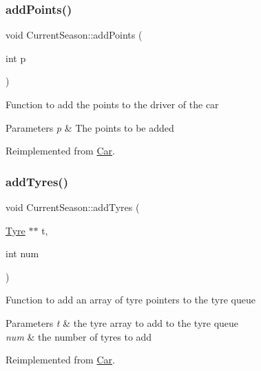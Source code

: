 \subsubsection{\texorpdfstring{add\+Points()}{addPoints()}}
{\footnotesize\ttfamily void Current\+Season\+::add\+Points (\begin{DoxyParamCaption}\item[{int}]{p }\end{DoxyParamCaption})\hspace{0.3cm}{\ttfamily [virtual]}}

Function to add the points to the driver of the car 
\begin{DoxyParams}{Parameters}
{\em p} & The points to be added \\
\hline
\end{DoxyParams}


Reimplemented from \hyperlink{classCar_a946872fcdb7625c343e5caf90fa39617}{Car}.

\mbox{\label{classCurrentSeason_a62e6e6c10c5490084230d4c3722196e5}} 
\subsubsection{\texorpdfstring{add\+Tyres()}{addTyres()}}
{\footnotesize\ttfamily void Current\+Season\+::add\+Tyres (\begin{DoxyParamCaption}\item[{\hyperlink{classTyre}{Tyre} $\ast$$\ast$}]{t,  }\item[{int}]{num }\end{DoxyParamCaption})\hspace{0.3cm}{\ttfamily [virtual]}}

Function to add an array of tyre pointers to the tyre queue 
\begin{DoxyParams}{Parameters}
{\em t} & the tyre array to add to the tyre queue \\
\hline
{\em num} & the number of tyres to add \\
\hline
\end{DoxyParams}


Reimplemented from \hyperlink{classCar_a5c5f22cb9232b88a53a4ffc324824aa1}{Car}.

\mbox{\label{classCurrentSeason_af605da3db8d851b07265951e5945669c}} 
